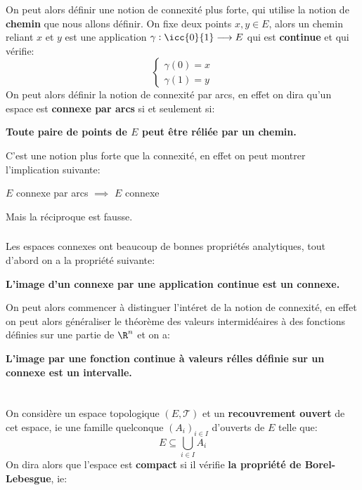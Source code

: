 \subsection*{}
On peut alors définir une notion de connexité plus forte, qui utilise la notion de \textbf{chemin} que nous allons définir. On fixe deux points \(x, y \in E\), alors un chemin reliant \(x\) et \(y\) est une application \(\gamma: \icc{0}{1} \longrightarrow E\) qui est \textbf{continue} et qui vérifie:
\[
   \begin{cases}
      \gamma(0) = x \\
      \gamma(1) = y
   \end{cases}
\]
On peut alors définir la notion de connexité par arcs, en effet on dira qu'un espace est \textbf{connexe par arcs} si et seulement si:
\begin{center}
   \textbf{Toute paire de points de \(E\) peut être réliée par un chemin.}
\end{center}
C'est une notion plus forte que la connexité, en effet on peut montrer l'implication suivante:
\begin{center}
   \(E\) connexe par arcs \(\implies\) \(E\) connexe
\end{center}
Mais la réciproque est fausse.

\subsection*{}
Les espaces connexes ont beaucoup de bonnes propriétés analytiques, tout d'abord on a la propriété suivante:
\begin{center}
   \textbf{L'image d'un connexe par une application continue est un connexe.}
\end{center}
On peut alors commencer à distinguer l'intéret de la notion de connexité, en effet on peut alors généraliser le théorème des valeurs intermidéaires à des fonctions définies sur une partie de \(\R^n\) et on a:
\begin{center}
   \textbf{L'image par une fonction continue à valeurs rélles définie sur un connexe est un intervalle.}
\end{center}

\chapter*{}
On considère un espace topologique \((E, \mathcal{T})\) et un \textbf{recouvrement ouvert} de cet espace, ie une famille quelconque \((A_i)_{i \in I}\) d'ouverts de \(E\) telle que:
\[
   E \subseteq \bigcup_{i \in I} A_i  
\]
On dira alors que l'espace est \textbf{compact} si il vérifie \textbf{la propriété de Borel-Lebesgue}, ie:

